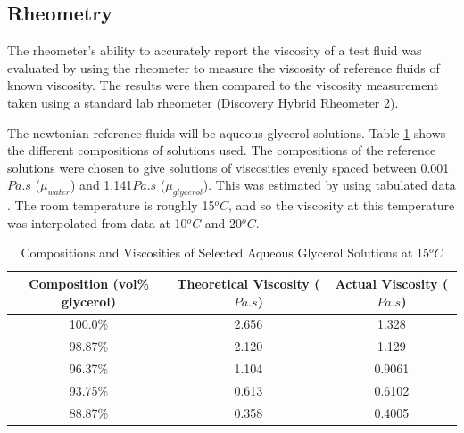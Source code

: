 \documentclass[twoside,a4]{report}
\begin{document}
	\subsection*{Rheometry}
	The rheometer's ability to accurately report the viscosity of a test fluid was evaluated by using the rheometer to measure the viscosity of reference fluids of known viscosity. The results were then compared to the viscosity measurement taken using a standard lab rheometer (Discovery Hybrid Rheometer 2).\\
	
	
    \noindent
	The newtonian reference fluids will be aqueous glycerol solutions. Table \ref{tabreffluvisc} shows the different compositions of solutions used. The compositions of the reference solutions were chosen to give solutions of viscosities evenly spaced between 0.001$Pa.s$ ($\mu_{water}$) and 1.141$Pa.s$ ($\mu_{glycerol}$). This was estimated by using tabulated data \cite{seguroberglycsolvisc}. The room temperature is roughly 15$^oC$, and so the viscosity at this temperature was interpolated from data at 10$^oC$ and 20$^oC$.\\
	\begin{table}
		\centering
		\begin{tabular}{| c | c | c |}
			\hline
			Composition (vol\% glycerol) & Theoretical Viscosity ($Pa.s$) & Actual Viscosity ($Pa.s$)\\
			\hline
			100.0\% & 2.656 & 1.328 \\
			98.87\% & 2.120 & 1.129 \\
			96.37\% & 1.104 & 0.9061 \\
			93.75\% & 0.613 & 0.6102 \\
			88.87\% & 0.358 & 0.4005 \\
			\hline
		\end{tabular}
		\caption{Compositions and Viscosities of Selected Aqueous Glycerol Solutions at 15$^o C$}
		\label{tabreffluvisc}
	\end{table}
	
\end{document}

